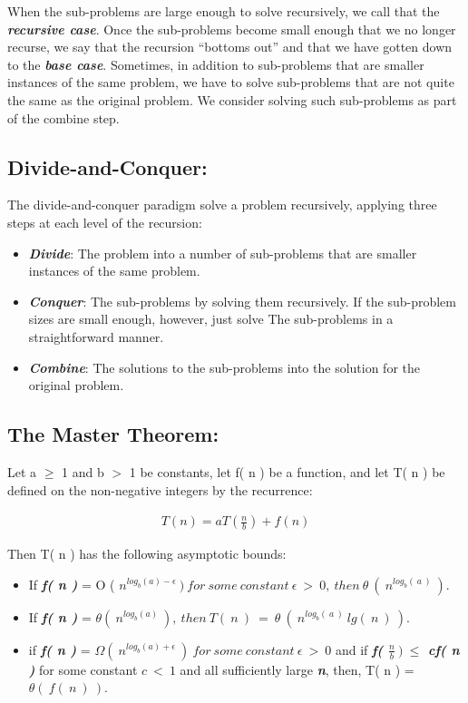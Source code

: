\documentclass[10pt,a4paper]{article}
\begin{document}
When the sub-problems are large enough to solve recursively, we call that the {\bfseries\itshape recursive case}. Once the sub-problems become small enough that we no longer recurse, we say that the recursion “bottoms out” and that we have gotten down to the {\bfseries\itshape base case}. Sometimes, in addition to sub-problems that are smaller instances of the same problem, we have to solve sub-problems that are not quite the same as the original
problem. We consider solving such sub-problems as part of the combine step. 

\subsection{Divide-and-Conquer:}

The divide-and-conquer paradigm solve a problem recursively, applying three steps at each level of the recursion:

\begin{itemize}
\item {\bfseries\itshape Divide}: The problem into a number of sub-problems that are smaller instances of the
same problem.
\item {\bfseries\itshape Conquer}: The sub-problems by solving them recursively. If the sub-problem sizes are
small enough, however, just solve The sub-problems in a straightforward manner.
\item {\bfseries\itshape Combine}: The solutions to the sub-problems into the solution for the original problem.
\end{itemize}

\subsection{The Master Theorem:}

Let a $\geq$ 1 and b $>$ 1 be constants, let f( n ) be a function, and let T( n ) be defined
on the non-negative integers by the recurrence:

\begin{ceqn}
\begin{align}
T(n) = aT(\frac{n}{b}) + f(n)
\end{align}
\end{ceqn}

Then T( n ) has the following asymptotic bounds:

\begin{itemize}
\item If {\bfseries\itshape f( n )} = O ( $n^{log_{b}( a ) - \epsilon}\ )\ for\ some\ constant\ \epsilon\ >\ 0,\ then\ \theta\ (\ n^{log_{b}(\ a\ )}\ )$.
\item If {\bfseries\itshape f( n )} = $ \theta (\ n^{log_{b}( a )}\ ),\ then\ T(\ n\ )\ =\ \theta\ (\ n^{log_{b}(\ a\ )}\ lg(\ n\ )\ )$.
\item if {\bfseries\itshape f( n )} = $\Omega (\ n^{log_{b}( a ) + \epsilon}\ )\ for\ some\ constant\ \epsilon\ >\ 0$ and if {\bfseries\itshape f( $\frac{n}{b}\ )\ \leq$ cf( n )} for some constant $c\ <\ 1$ and all sufficiently large {\bfseries\itshape n}, then, T( n ) = $\theta (\ f(\ n\ )\ )$.
\end{itemize}
\pagebreak
\end{document}
